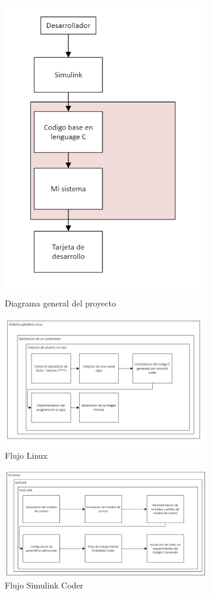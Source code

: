 \documentclass[12pt,letterpaper]{article}
\begin{document}
\begin{figure}[h!]
    \centering
    \includegraphics[width=0.8\textwidth]{images/diagrama1.png}
    \caption{Diagrama general del proyecto}
    \label{fig:diagrama_general_proyecto}
\end{figure}

  \begin{figure}[h!]
    \centering
    \includegraphics[width=0.8\textwidth]{images/diagrama2.png}
    \caption{Flujo Linux}
    \label{fig:flujo_linux}
  \end{figure}

  \begin{figure}[h!]
    \centering
    \includegraphics[width=0.8\textwidth]{images/diagrama3.png}
    \caption{Flujo Simulink Coder}
    \label{fig:Simulink_coder}
  \end{figure}

%
%
\end{document}
